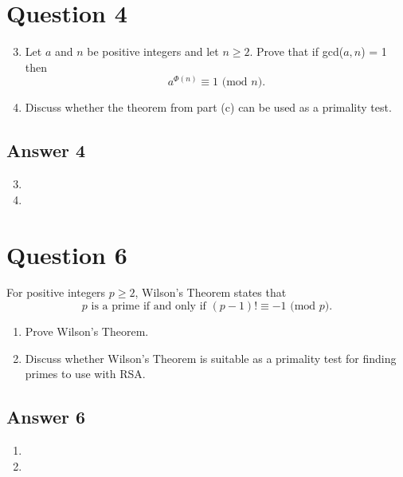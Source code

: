 \documentclass{article}
\begin{document}
	\medspace
	
	\section*{Question 4}
	\renewcommand{\theenumi}{\alph{enumi}}
	\begin{enumerate}
		\setcounter{enumi}{2}
		\item Let $a$ and $n$ be positive integers and let $n  \ge 2$. Prove that if gcd($a, n$) = 1 then
		$$
		a^{\Phi(n)} \equiv 1 \text{ (mod $n$)}.
		$$
		
		\item Discuss whether the theorem from part (c) can be used as a primality test.
	\end{enumerate}	

	\subsection*{Answer 4}
	\renewcommand{\theenumi}{\alph{enumi}}
	\begin{enumerate}
		\setcounter{enumi}{2}
		\item 
		
		\item 
	\end{enumerate}	

	\medspace

	\section*{Question 6}
	For positive integers $p \ge 2$, Wilson’s Theorem states that 
	$$
	p \text{ is a prime if and only if } (p - 1)!  \equiv -1 \text{ (mod $p$).}
	$$
	\renewcommand{\theenumi}{\alph{enumi}}
	\begin{enumerate}
		\item Prove Wilson’s Theorem.
		
		\item Discuss whether Wilson’s Theorem is suitable as a primality test for finding	primes to use with RSA.
	\end{enumerate}	

	\subsection*{Answer 6}
	\renewcommand{\theenumi}{\alph{enumi}}
	\begin{enumerate}
		\item 
		
		\item 
	\end{enumerate}	
\end{document}
